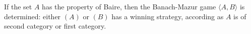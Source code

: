 If the set $A$ has the property of Baire, then the Banach-Mazur game $\langle A, B \rangle$ is determined: either $(A)$ or $(B)$ has a winning strategy, according as $A$ is of second category or first category.